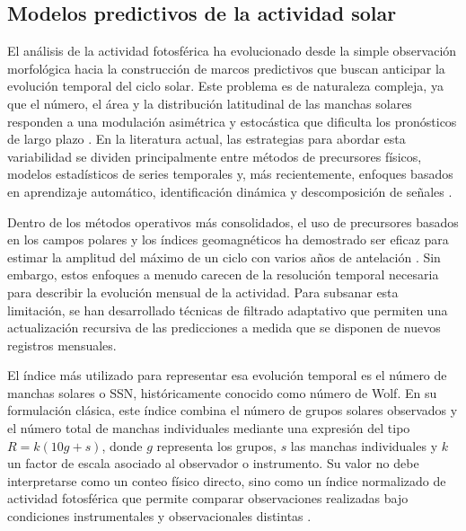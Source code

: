 \subsection{Modelos predictivos de la actividad solar}

El análisis de la actividad fotosférica ha evolucionado desde la simple observación morfológica hacia la construcción de marcos predictivos que buscan anticipar la evolución temporal del ciclo solar. Este problema es de naturaleza compleja, ya que el número, el área y la distribución latitudinal de las manchas solares responden a una modulación asimétrica y estocástica que dificulta los pronósticos de largo plazo \citep{pesnell2012predictions}. En la literatura actual, las estrategias para abordar esta variabilidad se dividen principalmente entre métodos de precursores físicos, modelos estadísticos de series temporales y, más recientemente, enfoques basados en aprendizaje automático, identificación dinámica y descomposición de señales \citep{clette2014revisiting}.

Dentro de los métodos operativos más consolidados, el uso de precursores basados en los campos polares y los índices geomagnéticos ha demostrado ser eficaz para estimar la amplitud del máximo de un ciclo con varios años de antelación \citep{schatten2005precursor,svalgaard2005polar}. Sin embargo, estos enfoques a menudo carecen de la resolución temporal necesaria para describir la evolución mensual de la actividad. Para subsanar esta limitación, se han desarrollado técnicas de filtrado adaptativo que permiten una actualización recursiva de las predicciones a medida que se disponen de nuevos registros mensuales.

El índice más utilizado para representar esa evolución temporal es el número de manchas solares o SSN, históricamente conocido como número de Wolf. En su formulación clásica, este índice combina el número de grupos solares observados y el número total de manchas individuales mediante una expresión del tipo $R=k(10g+s)$, donde $g$ representa los grupos, $s$ las manchas individuales y $k$ un factor de escala asociado al observador o instrumento. Su valor no debe interpretarse como un conteo físico directo, sino como un índice normalizado de actividad fotosférica que permite comparar observaciones realizadas bajo condiciones instrumentales y observacionales distintas \citep{clette2007wolf,clette2014revisiting}.

